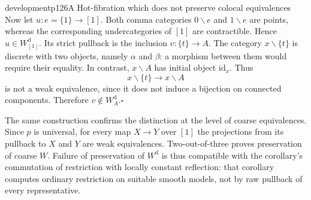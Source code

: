 \begin{dcomment}{development}{p126}{A Hot-fibration which does not preserve colocal equivalences}
Now let $u:e=\{1\}\to[1]$. Both comma categories $0\backslash e$ and $1\backslash e$ are points, whereas the corresponding undercategories of $[1]$ are contractible. Hence $u\in W_{[1]}^{\mathrm d}$. Its strict pullback is the inclusion $v:\{t\}\to A$. The category $x\backslash\{t\}$ is discrete with two objects, namely $\alpha$ and $\beta$: a morphism between them would require their equality. In contrast, $x\backslash A$ has initial object $\mathrm{id}_x$. Thus
\[
 x\backslash\{t\}\longrightarrow x\backslash A
\]
is not a weak equivalence, since it does not induce a bijection on connected components. Therefore $v\notin W_A^{\mathrm d}$.\hfill$\square$

The same construction confirms the distinction at the level of coarse equivalences. Since $p$ is universal, for every map $X\to Y$ over $[1]$ the projections from its pullback to $X$ and $Y$ are weak equivalences. Two-out-of-three proves preservation of coarse $W$. Failure of preservation of $W^{\mathrm d}$ is thus compatible with the corollary's commutation of restriction with locally constant reflection: that corollary computes ordinary restriction on suitable smooth models, not by raw pullback of every representative.
\end{dcomment}

